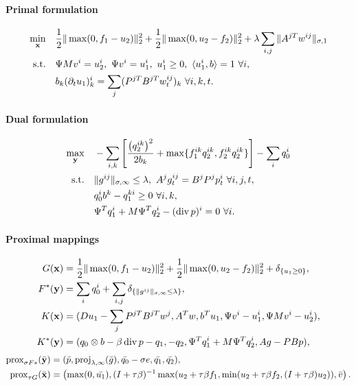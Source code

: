 \paragraph{Primal formulation}
\begin{align*}
    \min_{\mathbf{x}} \quad
        & \frac{1}{2} \|\max(0, f_1 - u_2)\|_2^2
            + \frac{1}{2} \|\max(0, u_2 - f_2)\|_2^2
            + \lambda \sum_{i,j} \| A^{jT} w^{ij} \|_{\sigma,1} \\
    \text{s.t.}\quad
        & \Psi M v^i = u_2^i, ~\Psi v^i = u_1^i,
          ~u_1^i \geq 0, ~\langle u_1^i, b \rangle = 1 ~\forall i, \\
        & b_k (\partial_t u_1)_k^i = \sum_j (P^{jT}B^{jT}w^{ij}_t)_{k} ~\forall i,k,t.
\end{align*}

\paragraph{Dual formulation}
\begin{align*}
    \max_{\mathbf{y}} \quad
        & -\sum_{i,k} \left[
                \frac{\left(q_2^{ik}\right)^2}{2b_k}
                + \max\{f_1^{ik} q_2^{ik},f_2^{ik} q_2^{ik}\}
        \right] - \sum_i q_0^i  \\
    \text{s.t.}\quad
        & \|g^{ij}\|_{\sigma,\infty} \leq \lambda,
          ~A^j g^{ij}_t = B^j P^j p^i_t ~\forall i,j,t, \\
        & q_0^i b^k - q_1^{ki} \geq 0 ~\forall i, k, \\
        & \Psi^T q_1^i + M \Psi^T q_2^i - (\operatorname{div} p)^i = 0 ~\forall i.
\end{align*}

\paragraph{Proximal mappings}
\begin{align*}
    G(\mathbf{x}) &=
        \frac{1}{2} \|\max(0, f_1 - u_2)\|_2^2
        + \frac{1}{2} \|\max(0, u_2 - f_2)\|_2^2
        + \delta_{\{u_1 \geq 0\}}, \\
    F^*(\mathbf{y}) &=
        \sum_{i} q_0^i
        + \sum_{i,j} \delta_{\{\|g^{ij}\|_{\sigma,\infty} \leq \lambda\}}, \\
    K(\mathbf{x}) &= (
        Du_1 - \sum_j P^{jT}B^{jT}w^{j},
        A^T w,
        b^T u_1,
        \Psi v^i - u_1^i,
        \Psi M v^i - u_2^i
    ), \\
    K^*(\mathbf{y}) &= (
        q_0 \otimes b - \beta \operatorname{div}{p} - q_1,
        -q_2,
        \Psi^T q_1^i + M \Psi^T q_2^i,
        A g - PBp
    ),
\end{align*}
\begin{align*}
    \operatorname{prox}_{\sigma F*}(\bar{\mathbf{y}})
    &= (
        \bar{p},
        \operatorname{proj}_{\lambda,\infty}(\bar{g}),
        \bar{q_0}-\sigma e,
        \bar{q_1},
        \bar{q_2}
   ), \\
    \operatorname{prox}_{\tau G}(\bar{\mathbf{x}})
    &= \left(
        \max(0,\bar{u_1}),
        (I + \tau\beta)^{-1} \max(u_2 + \tau \beta f_1,
                                \min(u_2 + \tau \beta f_2, (I + \tau\beta)u_2)),
        \bar{v}
    \right).
\end{align*}
